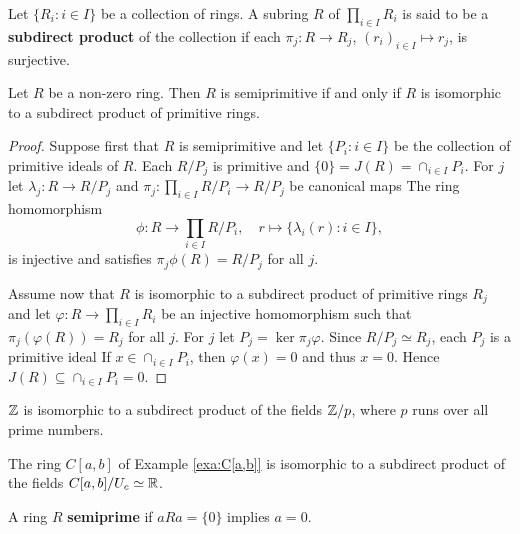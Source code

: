 \begin{definition}
	Let $\{R_i:i\in I\}$ be a collection of rings. A subring $R$ of
	$\prod_{i\in I}R_i$ is said to be a \textbf{subdirect product} of the
	collection if each $\pi_j\colon R\to R_j$, $(r_i)_{i\in I}\mapsto r_j$, is surjective. 
\end{definition}


\begin{theorem}
	\label{thm:subdirecto}
	Let $R$ be a non-zero ring. Then $R$ is semiprimitive if and only if
	$R$ is isomorphic to a subdirect product of primitive rings. 
\end{theorem}

\begin{proof}
	Suppose first that $R$ is semiprimitive and let $\{P_i:i\in I\}$ be the collection of 
	primitive ideals of $R$. Each $R/P_j$ is primitive and 
	$\{0\}=J(R)=\cap_{i\in I}P_i$. For $j$ let $\lambda_j\colon R\to
	R/P_j$ and $\pi_j\colon \prod_{i\in I}R/P_i\to R/P_j$ be canonical maps
	The ring homomorphism 
	\[
		\phi\colon R\to\prod_{i\in I}R/P_i,\quad
		r\mapsto \{\lambda_i(r):i\in I\},
	\]
	is injective and satisfies $\pi_j\phi(R)=R/P_j$ for all 
	$j$.

	Assume now that $R$ is isomorphic to a subdirect product of primitive rings 
	$R_j$ and let $\varphi\colon R\to\prod_{i\in I}R_i$ be an injective homomorphism 
	such that $\pi_j(\varphi(R))=R_j$ for all $j$. For $j$ 
	let $P_j=\ker\pi_j\varphi$. Since $R/P_j\simeq R_j$, each $P_j$ is a primitive ideal
	If $x\in\cap_{i\in I}P_i$, then $\varphi(x)=0$ and thus $x=0$.
	Hence $J(R)\subseteq\cap_{i\in I} P_i=0$. 
\end{proof}

\begin{example}
	$\mathbb{Z}$ is isomorphic to a subdirect product of the fields $\mathbb{Z}/p$, where 
	$p$ runs over all prime numbers. 
\end{example}

\begin{example}
	The ring $C[a,b]$ 
	of Example \ref{exa:C[a,b]}
	is isomorphic to a subdirect product of the fields 
	$C[a,b]/U_c\simeq\mathbb{R}$.
\end{example}

\begin{definition}
	A ring $R$ \textbf{semiprime} if 
	$aRa=\{0\}$ implies $a=0$.
\end{definition}

